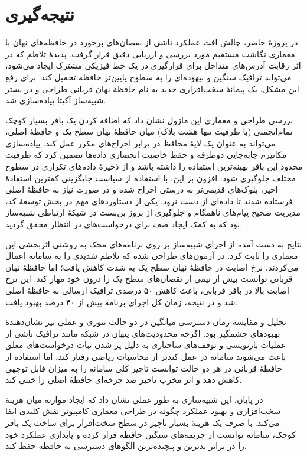 \chapter{نتیجه‌گیری}

در پروژهٔ حاضر، چالش افت عملکرد ناشی از نقصان‌های برخورد در حافظه‌های نهان با معماری نگاشت مستقیم مورد بررسی و ارزیابی دقیق قرار گرفت. پدیدهٔ تلاطم که در اثر رقابت آدرس‌های متداخل برای قرارگیری در یک خط فیزیکی مشترک ایجاد می‌شود، می‌تواند ترافیک سنگین و بیهوده‌ای را به سطوح پایین‌تر حافظه تحمیل کند. برای رفع این مشکل، یک پیمانهٔ سخت‌افزاری جدید به نام حافظهٔ نهان قربانی طراحی و در بستر شبیه‌ساز آکیتا پیاده‌سازی شد.

بررسی طراحی و معماری این ماژول نشان داد که اضافه کردن یک بافر بسیار کوچک تمام‌انجمنی (با ظرفیت تنها هشت بلاک) میان حافظهٔ نهان سطح یک و حافظهٔ اصلی، می‌تواند به عنوان یک لایهٔ محافظ در برابر اخراج‌های مکرر عمل کند. پیاده‌سازی مکانیزم جابه‌جایی دوطرفه و حفظ خاصیت انحصاری داده‌ها تضمین کرد که ظرفیت محدود این بافر بهینه‌ترین استفاده را داشته باشد و از ذخیرهٔ داده‌های تکراری در سطوح مختلف جلوگیری شود. افزون بر این، با استفاده از سیاست جایگزینی کمترین استفادهٔ اخیر، بلوک‌های قدیمی‌تر به درستی اخراج شده و در صورت نیاز به حافظهٔ اصلی فرستاده شدند تا داده‌ای از دست نرود. یکی از دستاوردهای مهم در بخش توسعهٔ کد، مدیریت صحیح پیام‌های ناهمگام و جلوگیری از بروز بن‌بست در شبکهٔ ارتباطی شبیه‌ساز بود که به کمک ایجاد صف برای درخواست‌های در انتظار محقق گردید.

نتایج به دست آمده از اجرای شبیه‌ساز بر روی برنامه‌های محک به روشنی اثربخشی این معماری را ثابت کرد. در آزمون‌های طراحی شده که تلاطم شدیدی را به سامانه اعمال می‌کردند، نرخ اصابت در حافظهٔ نهان سطح یک به شدت کاهش یافت؛ اما حافظهٔ نهان قربانی توانست بیش از نیمی از نقصان‌های سطح یک را درون خود مهار کند. این نرخ اصابت بالا در بافر قربانی، باعث کاهش ۵۰ درصدی ترافیک ارسالی به حافظهٔ اصلی شد و در نتیجه، زمان کل اجرای برنامه بیش از ۴۰ درصد بهبود یافت.

تحلیل و مقایسهٔ زمان دسترسی میانگین در دو حالت تئوری و عملی نیز نشان‌دهندهٔ بهبودهای چشمگیر بود. اگرچه محدودیت‌های پنهان در شبکه مانند ترافیک ناشی از عملیات بازنویسی و توقف‌های ساختاری به دلیل پر شدن ثبات درخواست‌های معلق باعث می‌شوند سامانه در عمل کندتر از محاسبات ریاضی رفتار کند، اما استفاده از حافظهٔ قربانی در هر دو حالت توانست تاخیر کلی سامانه را به میزان قابل توجهی کاهش دهد و اثر مخرب تاخیر صد چرخه‌ای حافظهٔ اصلی را خنثی کند.

در پایان، این شبیه‌سازی به طور عملی نشان داد که ایجاد موازنه میان هزینهٔ سخت‌افزاری و بهبود عملکرد چگونه در طراحی معماری کامپیوتر نقش کلیدی ایفا می‌کند. با صرف یک هزینهٔ بسیار ناچیز در سطح سخت‌افزار برای ساخت یک بافر کوچک، سامانه توانست از جریمه‌های سنگین حافظه فرار کرده و پایداری عملکرد خود را در برابر بدترین و پیچیده‌ترین الگوهای دسترسی به حافظه حفظ کند.